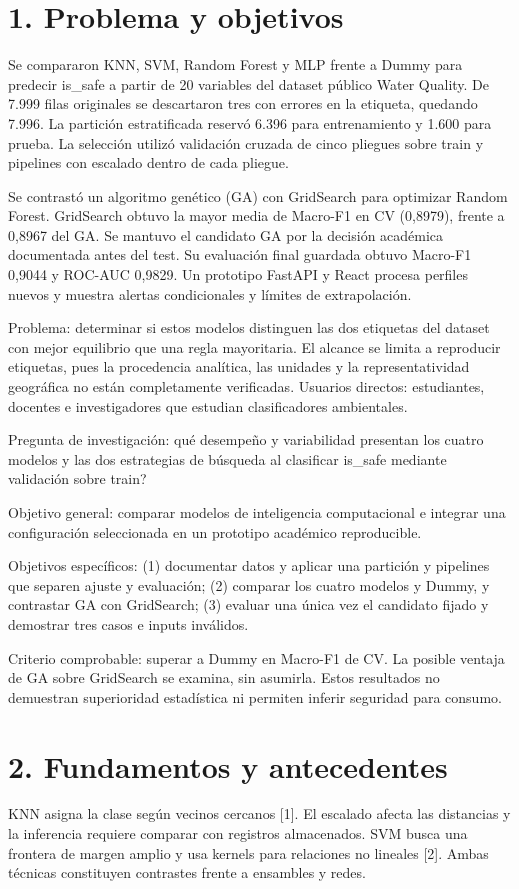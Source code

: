 \documentclass[12pt,a4paper]{article}
\begin{document}
\section*{1. Problema y objetivos}
Se compararon KNN, SVM, Random Forest y MLP frente a Dummy para predecir is\_safe a partir de 20 variables del dataset público Water Quality. De 7.999 filas originales se descartaron tres con errores en la etiqueta, quedando 7.996. La partición estratificada reservó 6.396 para entrenamiento y 1.600 para prueba. La selección utilizó validación cruzada de cinco pliegues sobre train y pipelines con escalado dentro de cada pliegue.

Se contrastó un algoritmo genético (GA) con GridSearch para optimizar Random Forest. GridSearch obtuvo la mayor media de Macro-F1 en CV (0,8979), frente a 0,8967 del GA. Se mantuvo el candidato GA por la decisión académica documentada antes del test. Su evaluación final guardada obtuvo Macro-F1 0,9044 y ROC-AUC 0,9829. Un prototipo FastAPI y React procesa perfiles nuevos y muestra alertas condicionales y límites de extrapolación.

Problema: determinar si estos modelos distinguen las dos etiquetas del dataset con mejor equilibrio que una regla mayoritaria. El alcance se limita a reproducir etiquetas, pues la procedencia analítica, las unidades y la representatividad geográfica no están completamente verificadas. Usuarios directos: estudiantes, docentes e investigadores que estudian clasificadores ambientales.

Pregunta de investigación: \textquestiondown{}qu\'{e} desempeño y variabilidad presentan los cuatro modelos y las dos estrategias de búsqueda al clasificar is\_safe mediante validación sobre train?

Objetivo general: comparar modelos de inteligencia computacional e integrar una configuración seleccionada en un prototipo académico reproducible.

Objetivos específicos: (1) documentar datos y aplicar una partición y pipelines que separen ajuste y evaluación; (2) comparar los cuatro modelos y Dummy, y contrastar GA con GridSearch; (3) evaluar una única vez el candidato fijado y demostrar tres casos e inputs inválidos.

Criterio comprobable: superar a Dummy en Macro-F1 de CV. La posible ventaja de GA sobre GridSearch se examina, sin asumirla. Estos resultados no demuestran superioridad estadística ni permiten inferir seguridad para consumo.

\clearpage
\section*{2. Fundamentos y antecedentes}
KNN asigna la clase según vecinos cercanos [1]. El escalado afecta las distancias y la inferencia requiere comparar con registros almacenados. SVM busca una frontera de margen amplio y usa kernels para relaciones no lineales [2]. Ambas técnicas constituyen contrastes frente a ensambles y redes.
\end{document}
